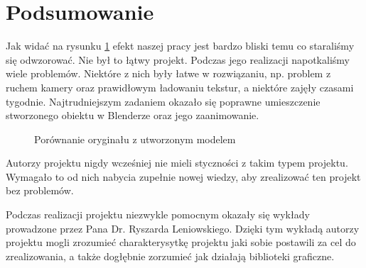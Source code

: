 \documentclass[a4paper,12pt]{article}
\numberwithin{equation}{section}
\begin{document}
\section{Podsumowanie}

Jak widać na rysunku \ref{fig:furgon} efekt naszej pracy jest bardzo bliski temu co staraliśmy się odwzorować. Nie był to łątwy projekt. Podczas jego realizacji napotkaliśmy wiele problemów. Niektóre z nich były łatwe w rozwiązaniu, np. problem z ruchem kamery oraz prawidłowym ładowaniu tekstur, a niektóre zajęły czasami tygodnie. Najtrudniejszym zadaniem okazało się poprawne umieszczenie stworzonego obiektu w Blenderze oraz jego zaanimowanie.

\begin{figure}[h!]
    \centering
    \caption{Porównanie oryginału z utworzonym modelem}
    \label{fig:furgon}
\end{figure}

Autorzy projektu nigdy wcześniej nie mieli styczności z takim typem projektu. Wymagało to od nich nabycia zupełnie nowej wiedzy, aby zrealizować ten projekt bez problemów.

Podczas realizacji projektu niezwykle pomocnym okazały się wykłady prowadzone przez Pana Dr. Ryszarda Leniowskiego. Dzięki tym wykładą autorzy projektu mogli zrozumieć charakterysytkę projektu jaki sobie postawili za cel do zrealizowania, a także dogłębnie zorzumieć jak działają biblioteki graficzne.
\end{document}
